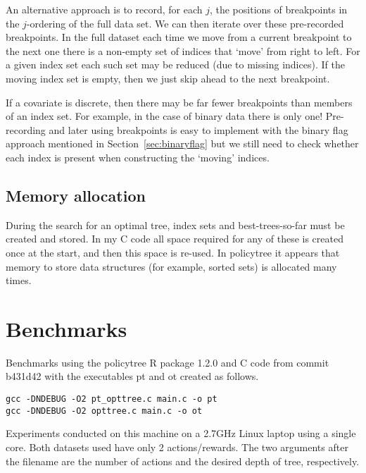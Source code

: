 \documentclass{article}
\begin{document}
An alternative approach is to record, for each $j$, the positions of
breakpoints in the $j$-ordering of the full data set. We can then
iterate over these pre-recorded breakpoints. In the full dataset each
time we move from a current breakpoint to the next one there is a non-empty
set of indices that `move' from right to left. For a given index set
each such set may be reduced (due to missing indices). If the moving
index set is empty, then we just skip ahead to the next breakpoint.

If a covariate is discrete, then there may be far fewer breakpoints
than members of an index set. For example, in the case of binary data
there is only one! Pre-recording and later using breakpoints is easy
to implement with the binary flag approach mentioned in
Section~\ref{sec:binaryflag} but we still need to check whether each
index is present when constructing the `moving' indices.

\subsection{Memory allocation}
\label{sec:memory}

During the search for an optimal tree, index sets and
best-trees-so-far must be created and stored. In my C code all space
required for any of these is created once at the start, and then this
space is re-used. In policytree it appears that memory to store data
structures (for example, sorted sets) is allocated many times.

\section{Benchmarks}
\label{sec:benchmarks}

Benchmarks using the policytree R package 1.2.0 and C code from commit b431d42 with the executables pt
and ot created as follows.

\begin{verbatim}
gcc -DNDEBUG -O2 pt_opttree.c main.c -o pt
gcc -DNDEBUG -O2 opttree.c main.c -o ot
\end{verbatim}

Experiments conducted on this machine on a 2.7GHz Linux laptop using a
single core. Both datasets used have only 2 actions/rewards. The two
arguments after the filename are the number of actions and the desired
depth of tree, respectively.
\end{document}

